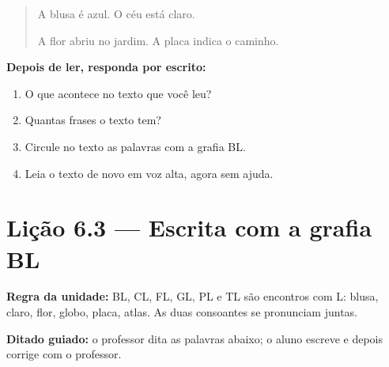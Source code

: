 \begin{quote}
A blusa é azul. O céu está claro.

A flor abriu no jardim. A placa indica o caminho.
\end{quote}

\textbf{Depois de ler, responda por escrito:}
\begin{enumerate}

  \item O que acontece no texto que você leu?
  \begin{center}
  \underline{\hspace{12cm}}
  \end{center}

  \item Quantas frases o texto tem?
  \begin{center}
  \underline{\hspace{12cm}}
  \end{center}

  \item Circule no texto as palavras com a grafia BL.

  \item Leia o texto de novo em voz alta, agora sem ajuda.

\end{enumerate}

\section{Lição 6.3 --- Escrita com a grafia BL}

\noindent\textbf{Regra da unidade:} BL, CL, FL, GL, PL e TL são encontros com L: blusa, claro, flor, globo, placa, atlas. As duas consoantes se pronunciam juntas.


\noindent\textbf{Ditado guiado:} o professor dita as palavras abaixo; o aluno escreve e depois corrige com o professor.

\begin{center}
  \underline{\hspace{2.3cm}} \quad \underline{\hspace{2.3cm}} \quad \underline{\hspace{2.3cm}} \quad \underline{\hspace{2.3cm}}

  \underline{\hspace{2.3cm}} \quad \underline{\hspace{2.3cm}} \quad \underline{\hspace{2.3cm}} \quad \underline{\hspace{2.3cm}}
\end{center}

